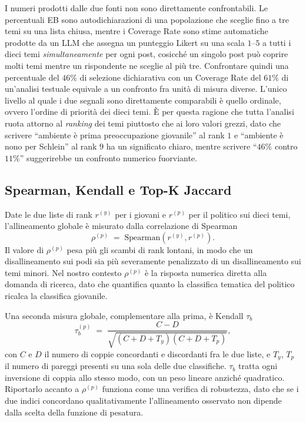 \documentclass[11pt, a4paper]{article}
\begin{document}
I numeri prodotti dalle due fonti non sono direttamente confrontabili.
Le percentuali EB sono autodichiarazioni di una popolazione che sceglie
fino a tre temi su una lista chiusa, mentre i Coverage Rate sono stime
automatiche prodotte da un LLM che assegna un punteggio Likert su una
scala $1$--$5$ a tutti i dieci temi \emph{simultaneamente} per ogni
post, cosicch\'e un singolo post pu\`o coprire molti temi mentre un
rispondente ne sceglie al pi\`u tre. Confrontare quindi una percentuale
del $46\%$ di selezione dichiarativa con un Coverage Rate del $61\%$ di
un'analisi testuale equivale a un confronto fra unit\`a di misura
diverse. L'unico livello al quale i due segnali sono direttamente
comparabili \`e quello ordinale, ovvero l'ordine di priorit\`a dei
dieci temi. \`E per questa ragione che tutta l'analisi ruota attorno al
\textit{ranking} dei temi piuttosto che ai loro valori grezzi, dato
che scrivere ``ambiente \`e prima preoccupazione giovanile'' al rank
$1$ e ``ambiente \`e nono per Schlein'' al rank $9$ ha un significato
chiaro, mentre scrivere ``$46\%$ contro $11\%$'' suggerirebbe un
confronto numerico fuorviante.

\subsection{Spearman, Kendall e Top-K Jaccard}

Date le due liste di rank $r^{(y)}$ per i giovani e $r^{(p)}$ per il
politico sui dieci temi, l'allineamento globale \`e misurato dalla
correlazione di Spearman
\[
  \rho^{(p)} \;=\; \mathrm{Spearman}\!\left(r^{(y)}, r^{(p)}\right).
\]
Il valore di $\rho^{(p)}$ pesa pi\`u gli scambi di rank lontani, in
modo che un disallineamento sui podi sia pi\`u severamente penalizzato
di un disallineamento sui temi minori. Nel nostro contesto $\rho^{(p)}$
\`e la risposta numerica diretta alla domanda di ricerca, dato che
quantifica quanto la classifica tematica del politico ricalca la
classifica giovanile.

Una seconda misura globale, complementare alla prima, \`e Kendall
$\tau_b$
\[
  \tau_b^{(p)} \;=\; \frac{C - D}{\sqrt{(C+D+T_y)(C+D+T_p)}},
\]
con $C$ e $D$ il numero di coppie concordanti e discordanti fra le due
liste, e $T_y$, $T_p$ il numero di pareggi presenti su una sola delle
due classifiche. $\tau_b$ tratta ogni inversione di coppia allo stesso
modo, con un peso lineare anzich\'e quadratico. Riportarlo accanto a
$\rho^{(p)}$ funziona come una verifica di robustezza, dato che se i
due indici concordano qualitativamente l'allineamento osservato non
dipende dalla scelta della funzione di pesatura.
\end{document}
